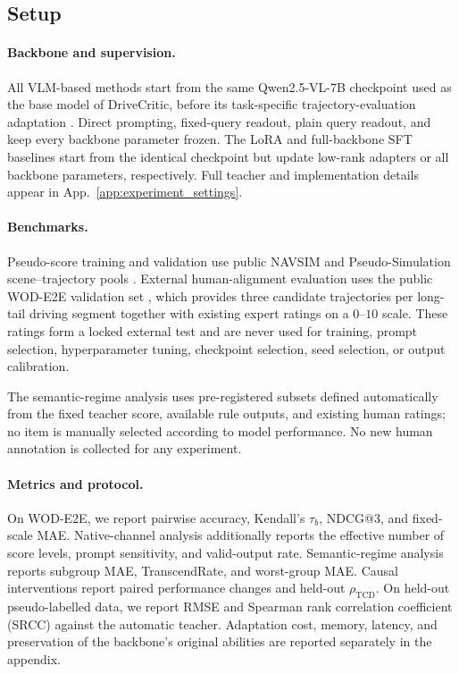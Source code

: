 
\providecommand{\est}[1]{\textcolor{black}{#1}}
\providecommand{\blankresult}{\phantom{00.000}}

\subsection{Setup}
\label{sec:setup}

\paragraph{Backbone and supervision.}
All VLM-based methods start from the same Qwen2.5-VL-7B checkpoint used as the
base model of DriveCritic, before its task-specific trajectory-evaluation
adaptation \citep{song2025drivecritic}. Direct prompting, fixed-query readout,
plain query readout, and \methodname{} keep every backbone parameter frozen.
The LoRA and full-backbone SFT baselines start from the identical checkpoint
but update low-rank adapters or all backbone parameters, respectively.
Full teacher and implementation details appear in
App.~\ref{app:experiment_settings}.

\paragraph{Benchmarks.}
Pseudo-score training and validation use public NAVSIM and Pseudo-Simulation
scene--trajectory pools \citep{dauner2024navsim,cao2025pseudosim}. External
human-alignment evaluation uses the public WOD-E2E validation set
\citep{xu2025wode2e}, which provides three candidate trajectories per
long-tail driving segment together with existing expert ratings on a
$0$--$10$ scale. These ratings form a locked external test and are never used
for training, prompt selection, hyperparameter tuning, checkpoint selection,
seed selection, or output calibration.

The semantic-regime analysis uses pre-registered subsets defined
automatically from the fixed teacher score, available rule outputs, and
existing human ratings; no item is manually selected according to model
performance. No new human annotation is collected for any experiment.

\paragraph{Metrics and protocol.}
On WOD-E2E, we report pairwise accuracy, Kendall's $\tau_b$, NDCG@3, and
fixed-scale MAE. Native-channel analysis additionally reports the effective
number of score levels, prompt sensitivity, and valid-output rate.
Semantic-regime analysis reports subgroup MAE, TranscendRate, and worst-group
MAE. Causal interventions report paired performance changes and held-out
$\rho_{\mathrm{TCD}}$. On held-out pseudo-labelled data, we report RMSE and
Spearman rank correlation coefficient (SRCC) against the automatic teacher.
Adaptation cost, memory, latency, and preservation of the backbone's original
abilities are reported separately in the appendix.


